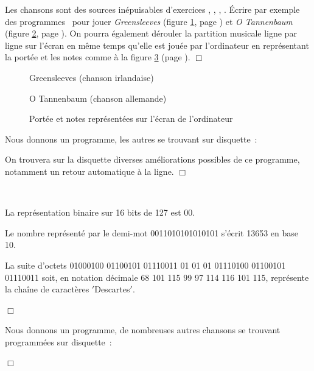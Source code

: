 \begin{exercice}{Les chansons sont des sources inépuisables d'exercices
 \cite{boutet}, \cite{sabatier1}, \cite{sabatier2}, \cite{sabatier3}. 
 Écrire par exemple des programmes 
\pascal\  pour jouer {\em Green\-sleeves\/} (figure \ref{fig:Greensleeves}, page \pageref{fig:Greensleeves})
et {\em O Tannenbaum\/} (figure \ref{fig:Tannenbaum}, page \pageref{fig:Tannenbaum}).
On pourra également dérouler la partition musicale ligne par ligne sur l'écran 
en même temps qu'elle est jouée par l'ordinateur en re\-pré\-sen\-tant la portée
et les notes comme  à la figure \ref{fig:RepNotes} (page \pageref{fig:RepNotes}).
\noindent $\Box$}\end{exercice}
\begin{figure}[htbp]
 
 \caption{Greensleeves (chanson irlandaise)}\label{fig:Greensleeves}
\end{figure}
\begin{figure}[htbp]
 
 \caption{O Tannenbaum  (chanson allemande)}\label{fig:Tannenbaum}
\end{figure}
\begin{figure}[htbp]
 \caption{Portée et notes représentées sur l'écran de l'ordinateur}\label{fig:RepNotes}
\end{figure}
\begin{corrige}{
Nous donnons un programme, les autres se trouvant sur disquette~:


On trouvera sur la disquette diverses améliorations possibles de ce programme, notamment
un retour automatique à la ligne.
\noindent $\Box$}\end{corrige}
\begin{corriges}{\ \\
\vspace{-\baselineskip}

\tiret La représentation binaire sur 16 bits de 127 est 
00.

\tiret Le nombre représenté par le demi-mot 0011010101010101 s'écrit
13653 en base 10.

\tiret La suite d'octets 01000100 01100101 01110011 01 01
01 01110100 01100101 01110011
soit, en notation décimale 68 101 115 99 97 114 116 101 115,
représente la chaîne de caractères
{\cha $\scriptstyle '$Descartes\idt $\scriptstyle '$}.

\noindent $\Box$}\end{corriges}
\begin{corrige}{
Nous donnons un programme, de nombreuses autres chansons se trouvant programmées sur disquette~:

\noindent $\Box$}\end{corrige}

